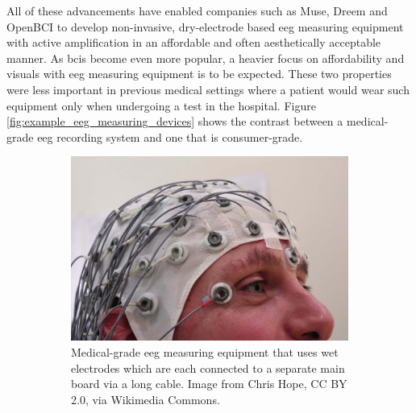 All of these advancements have enabled companies such as Muse, Dreem and OpenBCI to develop non-invasive, dry-electrode based \gls{eeg} measuring equipment with active amplification in an affordable and often aesthetically acceptable manner.
As \glspl{bci} become even more popular, a heavier focus on affordability and visuals with \gls{eeg} measuring equipment is to be expected.
These two properties were less important in previous medical settings where a patient would wear such equipment only when undergoing a test in the hospital.
Figure \ref{fig:example_eeg_measuring_devices} shows the contrast between a medical-grade \gls{eeg} recording system and one that is consumer-grade.

\begin{figure}[ht]
  \begin{minipage}{\textwidth}
    \centering
    \begin{subfigure}{.48\textwidth}
        \centering
        \includegraphics[width=\textwidth]{../images/introduction/wet_eeg.jpg}
        \captionsetup{width=0.9\linewidth}
        \captionsetup{justification=centering}
        \caption{Medical-grade \gls{eeg} measuring equipment that uses wet electrodes which are each connected to a separate main board via a long cable. Image from Chris Hope, CC BY 2.0, via Wikimedia Commons.\\ \hfill}
        \label{fig:example_eeg_measuring_devices_medical_bulky}
    \end{subfigure}
    \hfill
    \begin{subfigure}{.48\textwidth}
        \centering

\end{subfigure}
\end{minipage}
\end{figure}
